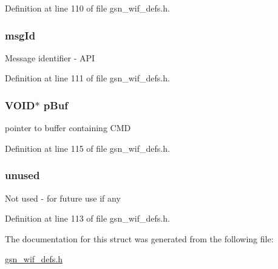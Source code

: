 Definition at line 110 of file gsn\_\-wif\_\-defs.h.

\hypertarget{a00322_aab6e2534fa56ef9bb0cd6fc1e781efd3}{
\subsubsection[{msgId}]{ {\bf msgId}}}
\label{a00322_aab6e2534fa56ef9bb0cd6fc1e781efd3}
Message identifier -\/ API 

Definition at line 111 of file gsn\_\-wif\_\-defs.h.

\hypertarget{a00322_ae73880d96d570d584a107c2b4ef84584}{
\subsubsection[{pBuf}]{\setlength{\rightskip}{0pt plus 5cm}VOID$\ast$ {\bf pBuf}}}
\label{a00322_ae73880d96d570d584a107c2b4ef84584}
pointer to buffer containing CMD 

Definition at line 115 of file gsn\_\-wif\_\-defs.h.

\hypertarget{a00322_a2c3ace150ddcb10d297a6d30b67d6330}{
\subsubsection[{unused}]{ {\bf unused}}}
\label{a00322_a2c3ace150ddcb10d297a6d30b67d6330}
Not used -\/ for future use if any 

Definition at line 113 of file gsn\_\-wif\_\-defs.h.



The documentation for this struct was generated from the following file:\begin{DoxyCompactItemize}
\item 
\hyperlink{a00610}{gsn\_\-wif\_\-defs.h}\end{DoxyCompactItemize}
